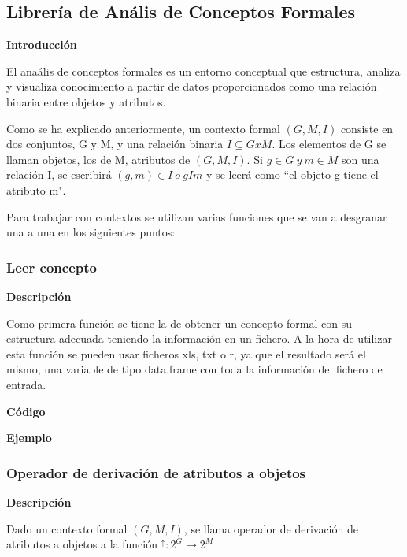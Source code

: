 \subsection{Librer\'ia de An\'alis de Conceptos Formales}

\textbf{Introducci\'on}

El ana\'alis de conceptos formales es un entorno conceptual que estructura, analiza y visualiza conocimiento a partir de datos proporcionados 
como una relaci\'on binaria entre objetos y atributos.

Como se ha explicado anteriormente, un contexto formal \( (G, M, I) \) consiste en dos conjuntos, G y M, y una relaci\'on binaria \( I \subseteq G x M \). Los elementos 
de G se llaman objetos, los de M, atributos de \( (G, M, I) \). Si \(g \in G ~ y ~ m \in M \) son una relaci\'on I, se escribir\'a 
\( (g,m) \in I ~ o ~ g I m \) y se leer\'a como ``el objeto g tiene el atributo m".

Para trabajar con contextos se utilizan varias funciones que se van a desgranar una a una en los siguientes puntos:

    \subsubsection{Leer concepto}

        \textbf{Descripci\'on}

        Como primera funci\'on se tiene la de obtener un concepto formal con su estructura adecuada teniendo la informaci\'on en un fichero. A la 
        hora de utilizar esta funci\'on se pueden usar ficheros xls, txt o r, ya que el resultado ser\'a el mismo, una variable de tipo data.frame 
        con toda la informaci\'on del fichero de entrada.

        \textbf{C\'odigo}

        

        \textbf{Ejemplo}



    \subsubsection{Operador de derivaci\'on de atributos a objetos}

        \textbf{Descripci\'on}

        Dado un contexto formal \( (G, M, I) \), se llama operador de derivaci\'on de atributos a objetos a la 
        funci\'on \( ^\uparrow : 2^G \rightarrow 2^M \)

